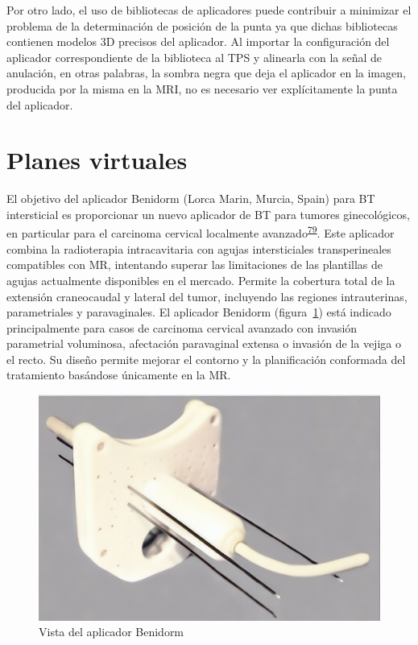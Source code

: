 \documentclass[
  a4paper,
]{scrreprt}
\begin{document}
Por otro lado, el uso de bibliotecas de aplicadores puede contribuir a
minimizar el problema de la determinación de posición de la punta ya que
dichas bibliotecas contienen modelos 3D precisos del aplicador. Al
importar la configuración del aplicador correspondiente de la biblioteca
al TPS y alinearla con la señal de anulación, en otras palabras, la
sombra negra que deja el aplicador en la imagen, producida por la misma
en la MRI, no es necesario ver explícitamente la punta del aplicador.

\hypertarget{sec-pv}{%
\section{Planes virtuales}\label{sec-pv}}

El objetivo del aplicador Benidorm (Lorca Marin, Murcia, Spain) para BT
intersticial es proporcionar un nuevo aplicador de BT para tumores
ginecológicos, en particular para el carcinoma cervical localmente
avanzado\textsuperscript{\protect\hyperlink{ref-villalba2015}{79}}. Este
aplicador combina la radioterapia intracavitaria con agujas
intersticiales transperineales compatibles con MR, intentando superar
las limitaciones de las plantillas de agujas actualmente disponibles en
el mercado. Permite la cobertura total de la extensión craneocaudal y
lateral del tumor, incluyendo las regiones intrauterinas, parametriales
y paravaginales. El aplicador Benidorm (figura~\ref{fig-tb}) está
indicado principalmente para casos de carcinoma cervical avanzado con
invasión parametrial voluminosa, afectación paravaginal extensa o
invasión de la vejiga o el recto. Su diseño permite mejorar el contorno
y la planificación conformada del tratamiento basándose únicamente en la
MR.

\begin{figure}

{\centering \includegraphics{img/TB.png}

}

\caption{\label{fig-tb}Vista del aplicador Benidorm}

\end{figure}
\end{document}
